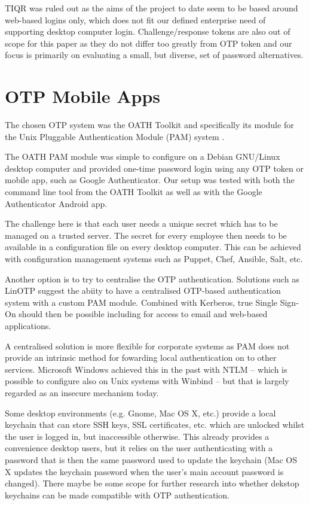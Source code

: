 \documentclass{report}
\begin{document}
TIQR was ruled out as the aims of the project to date seem to be based around
web-based logins only, which does not fit our defined enterprise need of
supporting desktop computer login. Challenge/response tokens are also
out of scope for this paper as they do not differ too greatly from OTP
token and our focus is primarily on evaluating a small, but diverse, set
of password alternatives.

\section{OTP Mobile Apps}
\label{sec:otp}

The chosen OTP system was the OATH Toolkit and specifically its
module for the Unix Pluggable Authentication Module (PAM) system
\parencite{samar1996unified}.

The OATH PAM module was simple to configure on a Debian GNU/Linux desktop
computer and provided one-time password login using any OTP token or mobile
app, such as Google Authenticator. Our setup was tested with both the
command line tool from the OATH Toolkit as well as with the
Google Authenticator Android app.

The challenge here is that each user needs a unique secret which has to
be managed on a trusted server. The secret for every employee then needs
to be available in a configuration file on every desktop computer. This
can be achieved with configuration management systems such as Puppet,
Chef, Ansible, Salt, etc.

Another option is to try to centralise the OTP authentication.
Solutions such as LinOTP suggest the abiity to have a centralised
OTP-based authentication system with a custom PAM module. Combined
with Kerberos, true Single Sign-On should then be possible
including for access to email and web-based applications.

A centralised solution is more flexible for corporate systems
as PAM does not provide an intrinsic method for fowarding local
authentication on to other services. Microsoft Windows achieved
this in the past with NTLM -- which is possible to configure
also on Unix systems with Winbind -- but that is largely
regarded as an insecure mechanism today.

Some desktop environments (e.g. Gnome, Mac OS X, etc.) provide
a local keychain that can store SSH keys, SSL certificates, etc.
which are unlocked whilst the user is logged in, but inaccessible
otherwise. This already provides a convenience desktop
users, but it relies on the user authenticating with a password
that is then the same password used to update the keychain
(Mac OS X updates the keychain password when the user's main
account password is changed). There maybe be some scope for
further research into whether dekstop keychains can be made
compatible with OTP authentication.
\end{document}
